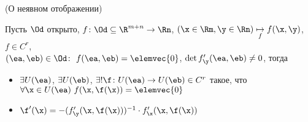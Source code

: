 \begin{theorem}(О неявном отображении)

    Пусть $\Od$ открыто, $f \colon \Od \subseteq \R^{m + n} \to \Rn$, $(\x \in
    \Rm, \y \in \Rn) \underset{f}{\mapsto} f(\x, \y)$, $f \in
    C^r$, \\ $(\ea, \eb) \in \Od \colon~ f(\ea, \eb) = \elemvec{0}$,
    $\det{f'_{\y}(\ea, \eb)} \neq 0$, тогда
    \begin{itemize}
        \item $\exists U(\ea)$, $\exists U(\eb)$, $\exists! \f \colon U(\ea)
        \to U(\eb) \in C^r$ такое, что $\forall \x \in U(\ea)~ f(\x, \f(\x)) =
        \elemvec{0}$ \item $\f'(\x) = -(f'_{\y}(\x, \f(\x)))^{-1} \cdot
        f'_{\x}(\x, \f(\x))$
    \end{itemize}
\end{theorem}
